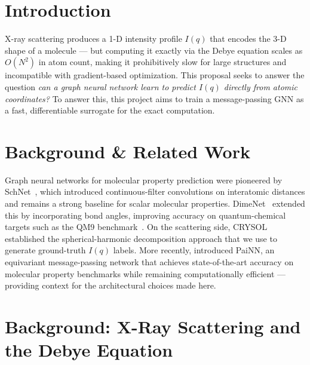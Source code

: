 \documentclass[final]{article}
\begin{document}
\section{Introduction}

X-ray scattering produces a 1-D intensity profile $I(q)$ that encodes the 3-D shape of a
molecule — but computing it exactly via the Debye equation scales as $O(N^2)$ in atom count,
making it prohibitively slow for large structures and incompatible with gradient-based
optimization. This proposal seeks to answer the question 
\emph{can a graph neural network learn to predict $I(q)$ directly from
atomic coordinates?} To answer this, this project aims to train a message-passing GNN as a fast, 
differentiable surrogate for the exact computation. 

\section{Background \& Related Work}
Graph neural networks for molecular property prediction were pioneered by
SchNet~\cite{schutt_schnet_2018}, which introduced continuous-filter convolutions on
interatomic distances and remains a strong baseline for scalar molecular properties.
DimeNet~\cite{gasteiger_dimenet_2020} extended this by incorporating bond angles, improving
accuracy on quantum-chemical targets such as the QM9 benchmark~\cite{ramakrishnan_qm9_2014}.
On the scattering side, CRYSOL~\cite{svergun_crysol_1995} established the spherical-harmonic
decomposition approach that we use to generate ground-truth $I(q)$ labels.
More recently, \citet{Schutt2021} introduced PaiNN, an equivariant message-passing network
that achieves state-of-the-art accuracy on molecular property benchmarks while remaining
computationally efficient — providing context for the architectural choices made here.

\section{Background: X-Ray Scattering and the Debye Equation}
\end{document}
